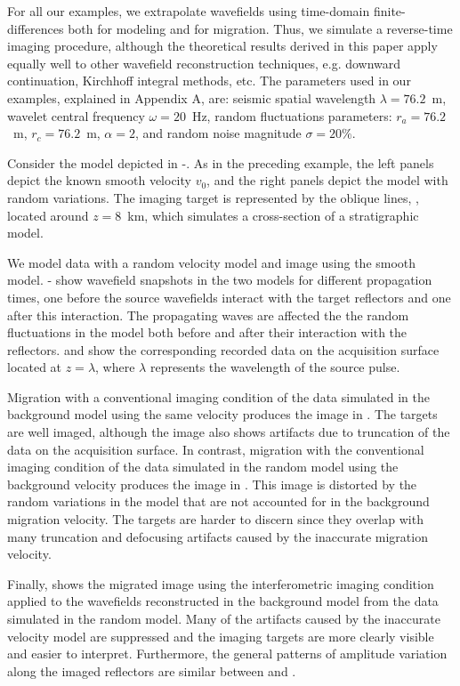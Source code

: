 For all our examples, we extrapolate wavefields using time-domain
finite-differences both for modeling and for migration. Thus, we
simulate a reverse-time imaging procedure, although the theoretical
results derived in this paper apply equally well to other wavefield
reconstruction techniques, e.g. downward continuation, Kirchhoff
integral methods, etc. The parameters used in our examples, explained
in Appendix A, are: seismic spatial wavelength $\lambda=76.2$~m,
wavelet central frequency $\omega=20$~Hz, random fluctuations
parameters: $r_a=76.2$~m, $r_c=76.2$~m, $\alpha=2$, and random noise
magnitude $\sigma=20\%$.

Consider the model depicted in -.
As in the preceding example, the left panels depict the known smooth
velocity $v_0$, and the right panels depict the model with random
variations. The imaging target is represented by the oblique lines,
, located around $z=8$~km, which simulates a
cross-section of a stratigraphic model.

We model data with a random velocity model and image using the smooth
model. - show wavefield snapshots
in the two models for different propagation times, one before the
source wavefields interact with the target reflectors and one after
this interaction. The propagating waves are affected the the random
fluctuations in the model both before and after their interaction with
the reflectors.  and  show the
corresponding recorded data on the acquisition surface located at
$z=\lambda$, where $\lambda$ represents the wavelength of the source
pulse.

Migration with a conventional imaging condition of the data simulated
in the background model using the same velocity produces the image in
. The targets are well imaged, although the image
also shows artifacts due to truncation of the data on the acquisition
surface. In contrast, migration with the conventional imaging
condition of the data simulated in the random model using the
background velocity produces the image in . This
image is distorted by the random variations in the model that are not
accounted for in the background migration velocity. The targets are
harder to discern since they overlap with many truncation and
defocusing artifacts caused by the inaccurate migration velocity.

Finally,  shows the migrated image using the
interferometric imaging condition applied to the wavefields
reconstructed in the background model from the data simulated in the
random model. Many of the artifacts caused by the inaccurate velocity
model are suppressed and the imaging targets are more clearly visible
and easier to interpret. Furthermore, the general patterns of
amplitude variation along the imaged reflectors are similar between
 and .


